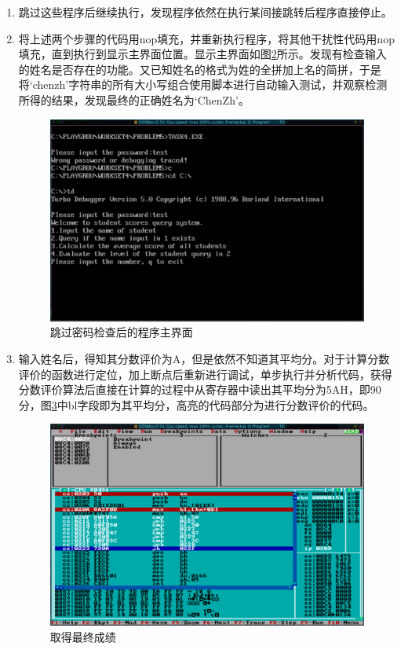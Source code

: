 \documentclass{article}
\begin{document}
\begin{enumerate}
\begin{figure}[H]
				\label{fig:timecheck}
			\end{figure}
		\item 跳过这些程序后继续执行，发现程序依然在执行某间接跳转后程序直接停止。
		\item 将上述两个步骤的代码用nop填充，并重新执行程序，将其他干扰性代码用nop填充，直到执行到显示主界面位置。显示主界面如图\ref{fig:mainUI}所示。发现有检查输入的姓名是否存在的功能。又已知姓名的格式为姓的全拼加上名的简拼，于是将`chenzh'字符串的所有大小写组合使用脚本进行自动输入测试，并观察检测所得的结果，发现最终的正确姓名为`ChenZh'。
			\begin{figure}[H]
				\centering
				\includegraphics[width=0.85\linewidth]{res/homework_4/mainUI.png}
				\caption{跳过密码检查后的程序主界面}
				\label{fig:mainUI}
			\end{figure}
		\item 输入姓名后，得知其分数评价为A，但是依然不知道其平均分。对于计算分数评价的函数进行定位，加上断点后重新进行调试，单步执行并分析代码，获得分数评价算法后直接在计算的过程中从寄存器中读出其平均分为5AH，即90分，图\ref{fig:finalGrade}中bl字段即为其平均分，高亮的代码部分为进行分数评价的代码。
			\begin{figure}[H]
				\centering
				\includegraphics[width=0.85\linewidth]{res/homework_4/finalGrade.png}
				\caption{取得最终成绩}
				\label{fig:finalGrade}
			\end{figure}
	\end{enumerate}
\end{document}
